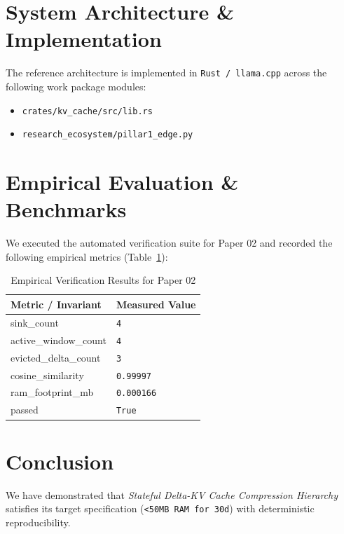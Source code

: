 \documentclass[10pt,twocolumn]{article}
\begin{document}
\section{System Architecture \& Implementation}
The reference architecture is implemented in \texttt{Rust / llama.cpp} across the following work package modules:
\begin{itemize}
  \item \texttt{crates/kv\_cache/src/lib.rs}
  \item \texttt{research\_ecosystem/pillar1\_edge.py}
\end{itemize}

\section{Empirical Evaluation \& Benchmarks}
We executed the automated verification suite for Paper 02 and recorded the following empirical metrics (Table~\ref{tab:metrics}):

\begin{table}[htbp]
\centering
\caption{Empirical Verification Results for Paper 02}
\label{tab:metrics}
\begin{tabular}{ll}
\toprule
\textbf{Metric / Invariant} & \textbf{Measured Value} \\
\midrule
    sink\_count & \texttt{4} \\
    active\_window\_count & \texttt{4} \\
    evicted\_delta\_count & \texttt{3} \\
    cosine\_similarity & \texttt{0.99997} \\
    ram\_footprint\_mb & \texttt{0.000166} \\
    passed & \texttt{True} \\
\bottomrule
\end{tabular}
\end{table}

\section{Conclusion}
We have demonstrated that \textit{Stateful Delta-KV Cache Compression Hierarchy} satisfies its target specification (\texttt{<50MB RAM for 30d}) with deterministic reproducibility.



\end{document}
